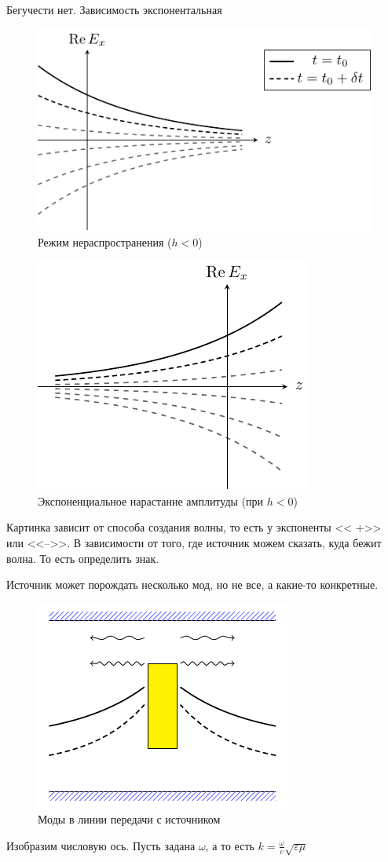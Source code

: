 \documentclass[a4paper,14pt]{extarticle}
\renewcommand{\epsilon}{\varepsilon}
\begin{document}
Бегучести нет.
Зависимость экспонентальная
\begin{figure}[h!]
	\centering
	\includegraphics[scale=1]{img/lect3_ris2}
	\caption{Режим нераспространения ($h<0$)}
	\label{fig:lect3:2}
\end{figure}

\begin{figure}[h!]
	\centering
	\includegraphics[scale=1]{img/lect3_ris3}
	\caption{Экспоненциальное нарастание амплитуды (при $h<0$)}
	\label{fig:lect3:3}
\end{figure}
Картинка зависит от способа создания волны, то есть у экспоненты << +>> или <<-->>. В зависимости от того, где источник можем сказать, куда бежит волна. То есть определить знак.

Источник может порождать несколько мод, но не все, а какие-то конкретные.
\begin{figure}[h!]
	\centering
	\includegraphics[scale=1]{img/lect3_ris4}
	\caption{Моды в линии передачи с источником}
	\label{fig:lect3:4}
\end{figure}
Изобразим числовую ось.
Пусть задана $\omega$, а то есть $k = \frac{\omega}{c} \sqrt{\epsilon \mu}$
\end{document}
